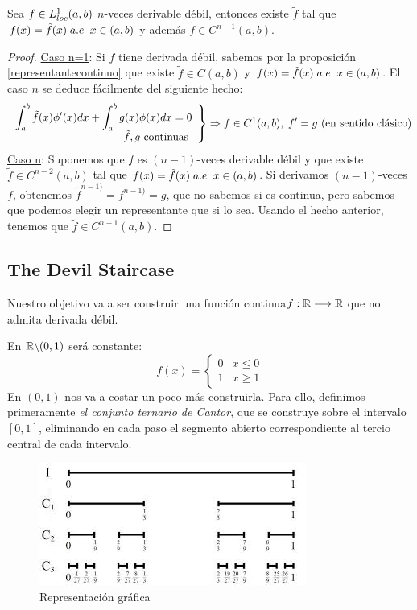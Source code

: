 \begin{prop}
\label{derivadanesima}
Sea $f\in L^1_{loc}(a,b)$ $n$-veces derivable débil, entonces existe $\tilde{f}$ tal que $f(x)=\tilde{f}(x) \; a.e \;\; x\in(a,b)$ y además $\tilde{f}\in C^{n-1}(a,b)$.
\end{prop}

\begin{proof}
\underline{Caso n=1}: Si $f$ tiene derivada débil, sabemos por la proposición \ref{representantecontinuo} que existe $\tilde{f}\in C(a,b)$ y $f(x)=\tilde{f}(x) \;a.e \;\; x\in(a,b)$.
El caso $n$ se deduce fácilmente del siguiente hecho:
\[
\left.
\begin{array}{r}
\displaystyle\int_{ a }^{ b } \tilde{f}(x)\phi'(x)dx+\displaystyle\int_{ a }^{ b } g(x)\phi(x)dx=0 \\
\tilde{f}, g \text{ continuas }
\end{array}
\right\} \Rightarrow \tilde{f}\in C^1(a,b), \;\tilde{f}'=g \text{ (en sentido clásico)}
\]
\underline{Caso n}: Suponemos que $f$ es $(n-1)$-veces derivable débil y que existe $\tilde{f}\in C^{n-2}(a,b)$ tal que $f(x)=\tilde{f}(x)\;a.e \;\; x\in(a,b)$.
Si derivamos $(n-1)$-veces $f$, obtenemos $\tilde{f}^{n-1)}=f^{n-1)}=g$, que no sabemos si es continua, pero sabemos que podemos elegir un representante que si lo sea. Usando el hecho anterior, tenemos que $\tilde{f}\in C^{n-1}(a,b)$.
\end{proof}

\subsection{The Devil Staircase}

Nuestro objetivo va a ser construir una función continua$f : \mathbb{R} \longrightarrow \mathbb{R}$ que no admita derivada débil.

En $\mathbb{R}\backslash(0,1)$ será constante:
\[
f(x)=\left\{
\begin{array}{cc}
0 & x\leq 0\\
1 & x\geq 1
\end{array}
\right.
\]
En $(0,1)$ nos va a costar un poco más construirla. Para ello, definimos primeramente \textit{el conjunto ternario de Cantor}, que se construye sobre el intervalo $[0,1]$, eliminando en cada paso el segmento abierto correspondiente al tercio central de cada intervalo.

\begin{figure}[h]
   \center
  \includegraphics[scale=0.5]{img/cantor.jpeg}
  \caption{Representación gráfica}
\end{figure}

